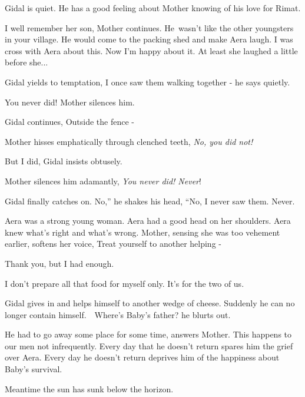 \documentclass[twoside,11pt]{book}
\begin{document}
Gidal is quiet. He has a good feeling about Mother knowing of his love for Rimat. 

{\textquotedbl}I well remember her son,{\textquotedbl} Mother continues. {\textquotedbl}He~wasn't like the other
youngsters in your village. He would come to the packing shed and make Aera laugh. I was cross with Aera about this.
Now I'm happy about it. At least she laughed a little before she... {\textquotedbl} 

Gidal yields to temptation, {\textquotedbl}I once saw them walking together -{\textquotedbl} he says quietly.

{\textquotedbl}You never did!{\textquotedbl} Mother silences him.

Gidal continues, {\textquotedbl}Outside the fence -{\textquotedbl} 

Mother hisses emphatically through clenched teeth, {\textquotedbl}\textit{No, you did not!}{\textquotedbl} 

{\textquotedbl}But I did,{\textquotedbl} Gidal insists obtusely.\ 

Mother silences him adamantly, {\textquotedbl}\textit{You never did! Never}!{\textquotedbl} 

Gidal finally catches on. {\textquotedbl}No,'' he shakes his head, ``No, I never saw them. Never.{\textquotedbl} 

{\textquotedbl}Aera was a strong young woman. Aera had a good head on her shoulders. Aera knew what's right and what's
wrong.{\textquotedbl} Mother, sensing she was too vehement earlier, softens her voice, {\textquotedbl}Treat yourself to
another helping -{\textquotedbl} 

{\textquotedbl}Thank you, but I had enough.{\textquotedbl}\ 

{\textquotedbl}I don't prepare all that food for myself only. It's for the two of us.{\textquotedbl}

Gidal gives in and helps himself to another wedge of cheese. Suddenly he can no longer contain
himself.\ \ {\textquotedbl}Where's Baby's father?{\textquotedbl} he blurts out.

{\textquotedbl}He had to go away some place for some time,{\textquotedbl} answers Mother. {\textquotedbl}This happens to
our men not infrequently. Every day that he doesn't return spares him the grief over Aera. Every day he doesn't return
deprives him of the happiness about Baby's survival.{\textquotedbl}\ 

Meantime the sun has sunk below the horizon. 
\end{document}
